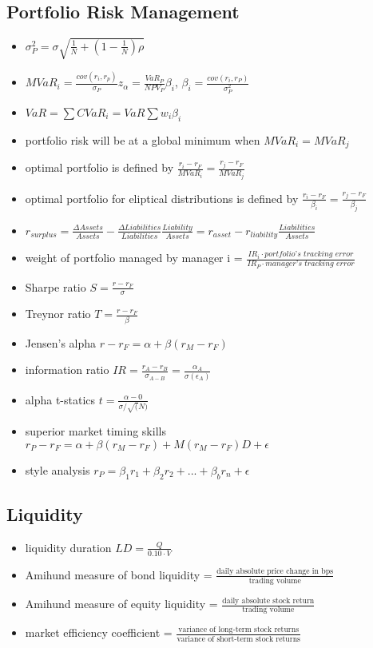 \subsection{Portfolio Risk Management}
\begin{itemize}
	\item $\sigma_P^2 = \sigma \sqrt{\frac{1}{N} + \left(1 - \frac{1}{N}\right)\rho}$
	\item $MVaR_i = \frac{cov(r_i, r_p)}{\sigma_P} z_{\alpha} = \frac{VaR_P}{NPV_P}\beta_i$, $\beta_i = \frac{cov(r_i, r_P)}{\sigma_P^2}$
	\item $VaR = \sum CVaR_i = VaR \sum w_i \beta_i$
	\item portfolio risk will be at a global minimum when $MVaR_i = MVaR_j$
	\item optimal portfolio is defined by $\frac{r_i - r_F}{MVaR_i} = \frac{r_j - r_F}{MVaR_j}$
	\item optimal portfolio for eliptical distributions is defined by $\frac{r_i - r_F}{\beta_i} = \frac{r_j - r_F}{\beta_j}$
	\item $r_{surplus} = \frac{\Delta Assets}{Assets} - \frac{\Delta Liabilities}{Liabilities}\frac{Liability}{Assets} = r_{asset} - r_{liability} \frac{Liabilities}{Assets}$
	\item weight of portfolio managed by manager i = $\frac{IR_i \cdot \textit{portfolio's tracking error}}{IR_P \cdot \textit{manager's tracking error}}$
	\item Sharpe ratio $S = \frac{r - r_F}{\sigma}$
	\item Treynor ratio $T = \frac{r - r_F}{\beta}$
	\item Jensen's alpha $r - r_F = \alpha + \beta(r_M - r_F)$
	\item information ratio $IR = \frac{r_A - r_B}{\sigma_{A - B}} = \frac{\alpha_A}{\sigma(\epsilon_A)}$
	\item alpha t-statics $t = \frac{\alpha - 0}{\sigma / \sqrt(N)}$
	\item superior market timing skills $r_P - r_F = \alpha + \beta(r_M - r_F) + M(r_M - r_F)D + \epsilon$
	\item style analysis $r_P = \beta_1 r_1 + \beta_2 r_2 + ... + \beta_b r_n + \epsilon$
\end{itemize}

\subsection{Liquidity}
\begin{itemize}
	\item liquidity duration $LD = \frac{Q}{0.10 \cdot V}$
	\item Amihund measure of bond liquidity = $\frac{\text{daily absolute price change in bps}}{\text{trading volume}}$
	\item Amihund measure of equity liquidity = $\frac{\text{daily absolute stock return}}{\text{trading volume}}$
	\item market efficiency coefficient  = $\frac{\text{variance of long-term stock returns}}{\text{variance of short-term stock returns}}$
\end{itemize}
